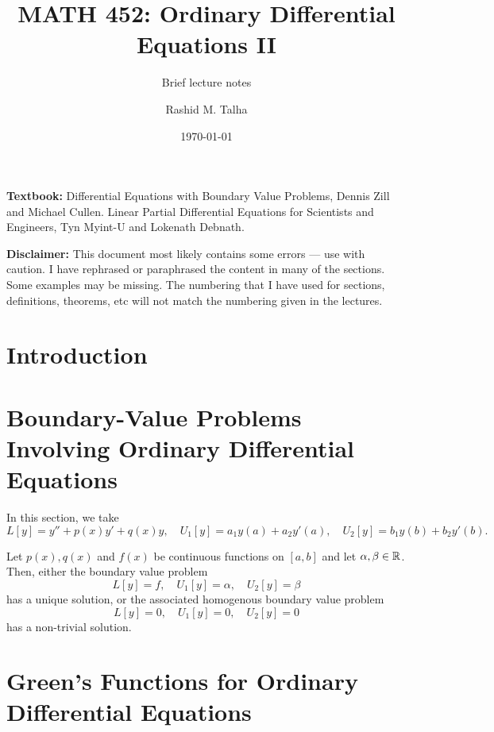 \documentclass[11pt]{penrose}
\title{MATH 452: Ordinary Differential Equations II}
\subtitle{Brief lecture notes}
\author{Rashid M. Talha}
\affiliation{School of Natural Sciences, NUST}
\date{\today}
\begin{document}
\maketitle

\textbf{Textbook:} Differential Equations with Boundary Value Problems, Dennis Zill and Michael Cullen. Linear Partial Differential Equations for Scientists and Engineers, Tyn Myint-U and Lokenath Debnath.

\textbf{Disclaimer:} This document most likely contains some errors --- use with caution. I have rephrased or paraphrased the content in many of the sections. Some examples may be missing. The numbering that I have used for sections, definitions, theorems, etc will not match the numbering given in the lectures.

\section{Introduction}

\section{Boundary-Value Problems Involving Ordinary Differential Equations}
In this section, we take
\begin{equation*}
    L[y] = y'' + p(x)y' + q(x)y,
    \quad
    U_1 [y] = a_1 y(a) + a_2 y'(a),
    \quad
    U_2 [y] = b_1 y(b) + b_2 y'(b).
\end{equation*}

\begin{nthm}
    Let $p(x), q(x)$ and $f(x)$ be continuous functions on $[a,b]$ and let $\alpha, \beta \in \mathbb{R}$. Then, either the boundary value problem
    \begin{equation*}
        L[y] = f,
        \quad
        U_1[y] = \alpha,
        \quad
        U_2[y] = \beta
    \end{equation*}
    has a unique solution, or the associated homogenous boundary value problem
    \begin{equation*}
        L[y] = 0,
        \quad
        U_1[y] = 0,
        \quad
        U_2[y] = 0
    \end{equation*}
    has a non-trivial solution.    
\end{nthm}

\section{Green's Functions for Ordinary Differential Equations}
\end{document}

